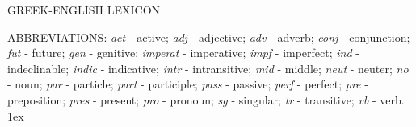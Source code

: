 \thispagestyle{empty}
\begin{center}
{\Huge GREEK-ENGLISH LEXICON}
\end{center}
\newpage

\pagestyle{fancy}
\cfoot{\gr{\thepage}}

{\small
\twocolumn
\noindent ABBREVIATIONS: {\em act} - active;
{\em adj} - adjective; {\em adv} - adverb; {\em conj} - conjunction; {\em fut} - future; {\em gen} - genitive; {\em imperat} - imperative; {\em impf} - imperfect;
{\em ind} - indeclinable; {\em indic} - indicative;
{\em intr} - intransitive; {\em mid} - middle; {\em neut} - neuter;
{\em no} - noun; 
{\em par} - particle; {\em part} - participle; {\em pass} - passive; {\em perf} - perfect;
{\em pre} - preposition; {\em pres} - present; {\em pro} - pronoun; {\em sg} - singular;
{\em tr} - transitive; {\em vb} - verb.
\baselineskip 1ex

}
